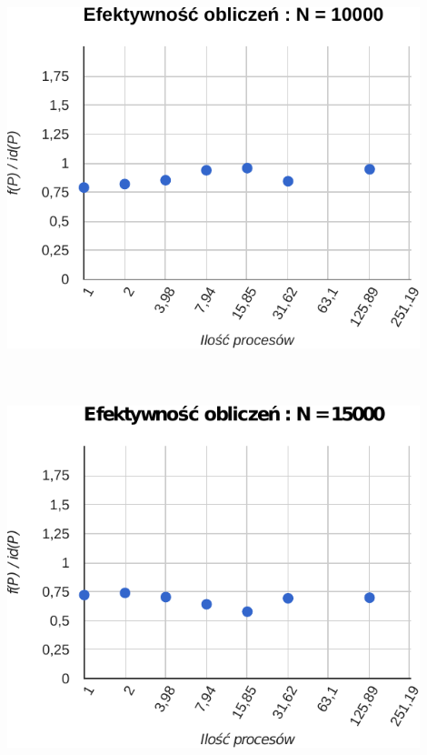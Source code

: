 \documentclass[paper=a4, fontsize=11pt]{scrartcl}	%
\numberwithin{equation}{section}		%
\numberwithin{figure}{section}			%
\numberwithin{table}{section}				%
\begin{document}
\includegraphics[width=120mm]{report/comp-eff-10000.pdf} \\ \ \\ \ \\ \ \\

\includegraphics[width=120mm]{report/comp-eff-15000.pdf} \\ \ \\ \ \\ \ \\
\end{document}
